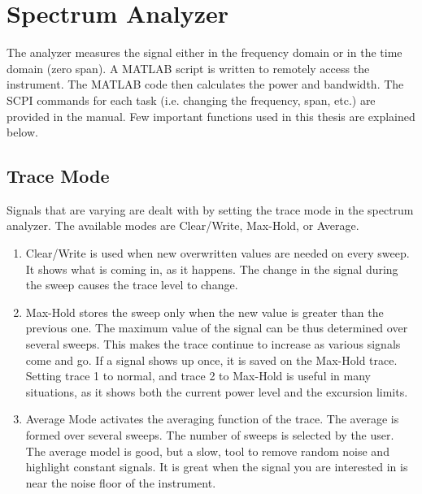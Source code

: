 \section{Spectrum Analyzer}
The analyzer measures the signal either in the frequency domain or in the time domain (zero span). A MATLAB\textregistered{} script is written to remotely access the instrument. The MATLAB\textregistered{} code then calculates the power and bandwidth. The \acf{SCPI} commands for each task (i.e. changing the frequency, span, etc.) are provided in the manual. Few important functions used in this thesis are explained below.

\subsection{Trace Mode}
Signals that are varying are dealt with by setting the trace mode in the spectrum analyzer. The available modes are Clear/Write, \acs{Max-Hold}, or Average.
\begin{enumerate}
  \item Clear/Write is used when new overwritten values are needed on every sweep. It shows what is coming in, as it happens. The change in the signal during the sweep causes the trace level to change. 
  \item \acs{Max-Hold} stores the sweep only when the new value is greater than the previous one. The maximum value of the signal can be thus determined over several sweeps. This makes the trace continue to increase as various signals come and go. If a signal shows up once, it is saved on the Max-Hold trace. Setting trace 1 to normal, and trace 2 to \acs{Max-Hold} is useful in many situations, as it shows both the current power level and the excursion limits.  
  \item Average Mode activates the averaging function of the trace. The average is formed over several sweeps. The number of sweeps is selected by the user. The average model is good, but a slow, tool to remove random noise and highlight constant signals. It is great when the signal you are interested in is near the noise floor of the instrument.  
  \end{enumerate}

